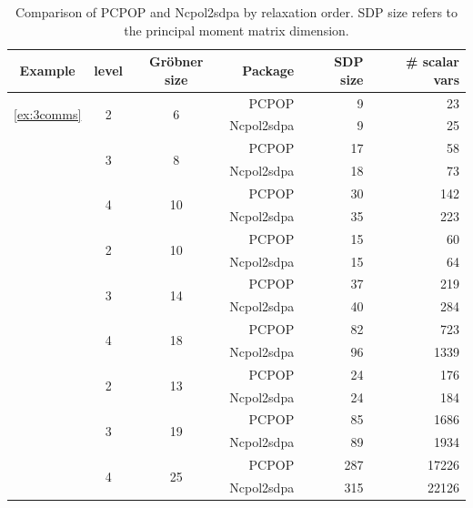\begin{table}[H]
	\centering
	\caption{Comparison of PCPOP and Ncpol2sdpa by relaxation order. SDP size refers to the principal moment matrix dimension.}
	\label{tab:compare-pcpop-ncpol}
	\begin{tabular}{@{}cccrrr@{}}
		\toprule
		Example & level & Gr\"obner size & Package & SDP size & \# scalar vars \\
		\midrule
		\multirow{2}{*}{\ref{ex:3comms}} & \multirow{2}{*}{2} & \multirow{2}{*}{6} & PCPOP      & 9 & 23 \\
		                           &                    &                      & Ncpol2sdpa & 9 & 25 \\
		\addlinespace
		\multirow{2}{*}{\ref{ex:3comms}} & \multirow{2}{*}{3} & \multirow{2}{*}{8} & PCPOP      & 17 & 58 \\
		                           &                    &                      & Ncpol2sdpa & 18 & 73 \\
		\addlinespace
        \multirow{2}{*}{\ref{ex:3comms}} & \multirow{2}{*}{4} & \multirow{2}{*}{10} & PCPOP      & 30 & 142 \\
		                           &                    &                      & Ncpol2sdpa & 35 & 223 \\
		\addlinespace

		\multirow{2}{*}{\ref{ex:4comms}} & \multirow{2}{*}{2} & \multirow{2}{*}{10} & PCPOP      & 15 & 60 \\
		                           &                    &                      & Ncpol2sdpa & 15 & 64 \\
		\addlinespace
		\multirow{2}{*}{\ref{ex:4comms}} & \multirow{2}{*}{3} & \multirow{2}{*}{14} & PCPOP      & 37 & 219 \\
		                           &                    &                      & Ncpol2sdpa & 40 & 284 \\
		\addlinespace
        \multirow{2}{*}{\ref{ex:4comms}} & \multirow{2}{*}{4} & \multirow{2}{*}{18} & PCPOP      & 82 & 723 \\
		                           &                    &                      & Ncpol2sdpa & 96 & 1339 \\
		\addlinespace
		\multirow{2}{*}{\ref{ex:5comms}} & \multirow{2}{*}{2} & \multirow{2}{*}{13} & PCPOP      & 24 & 176 \\
		                           &                    &                      & Ncpol2sdpa & 24 & 184 \\
		\addlinespace
		\multirow{2}{*}{\ref{ex:5comms}} & \multirow{2}{*}{3} & \multirow{2}{*}{19} & PCPOP      & 85 & 1686 \\
		                           &                    &                      & Ncpol2sdpa & 89 & 1934 \\
		\addlinespace
		\multirow{2}{*}{\ref{ex:5comms}} & \multirow{2}{*}{4} & \multirow{2}{*}{25} & PCPOP      & 287 & 17226 \\
		                           &                    &                      & Ncpol2sdpa & 315 & 22126 \\
		\bottomrule
	\end{tabular}
\end{table}
